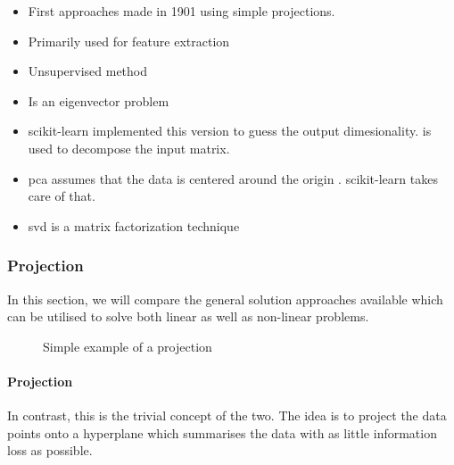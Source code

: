 \begin{itemize}
	\item First approaches made in 1901 using simple projections. \cite{pearson1901liii}
	\vspace{-2mm}
	\item Primarily used for feature extraction \cite{PythonMachineLearningCh5}
	\vspace{-2mm}
	\item Unsupervised method \cite{PythonMachineLearningCh5}
	\vspace{-2mm}
	\item Is an eigenvector problem \cite{MultilinearSubspaceLearningCh2}
	\vspace{-2mm}
	\item scikit-learn implemented this version \cite{minka2000automatic} to guess the output dimesionality. \cite{halko2009finding} is used to decompose the input matrix.
	\vspace{-2mm}
	\item \gls{pca} assumes that the data is centered around the origin \cite{HandsOnMLCh8}. scikit-learn takes care of that.
	\vspace{-2mm}
	\item \gls{svd} is a matrix factorization technique \cite{HandsOnMLCh8}
\end{itemize}




\subsubsection{Projection}


In this section, we will compare the general solution approaches available which can be utilised to solve both linear as well as non-linear problems. \cite{HandsOnMLCh8}


\renewcommand{\tikzscale}{0.33}
\begin{wrapfigure}[13]{r}{0.62\textwidth}
	\vspace*{-8mm}
	\centering
	
	\captionsetup{justification=centering}
	\caption{Simple example of a projection}
    \label{fig:projectionExample}
\end{wrapfigure}

\paragraph{Projection} In contrast, this is the trivial concept of the two. The idea is to project the data points onto a \gls{hyperplane} which summarises the data with as little information loss as possible.

